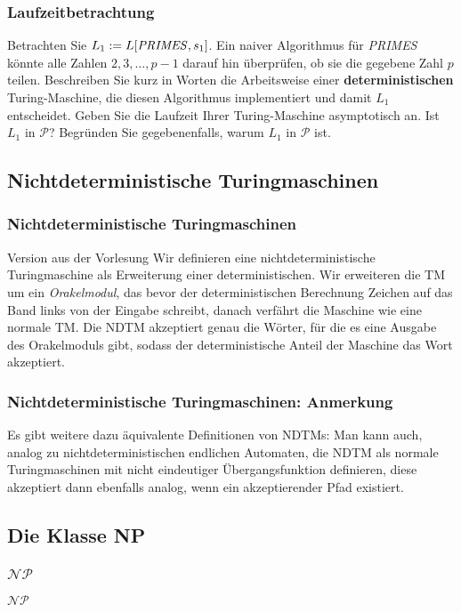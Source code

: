 \documentclass{beamer}
\begin{document}
{\begin{frame}
 \frametitle{Laufzeitbetrachtung}
 Betrachten Sie $L_1 := L[\text{\textit{PRIMES}},s_1]$. 
Ein naiver Algorithmus für \textit{PRIMES} könnte alle Zahlen $2,3,\ldots,p-1$ darauf hin überprüfen, ob sie die gegebene Zahl $p$ teilen. 
Beschreiben Sie kurz in Worten die Arbeitsweise einer \textbf{deterministischen} Turing-Maschine, die diesen Algorithmus implementiert und damit $L_1$ entscheidet. 
Geben Sie die Laufzeit Ihrer Turing-Maschine asymptotisch an. Ist $L_1$ in $\mathcal{P}$? Begründen Sie gegebenenfalls, warum $L_1$ in $\mathcal{P}$ ist.
\end{frame}

\subsection{Nichtdeterministische Turingmaschinen}
\begin{frame}
\frametitle{Nichtdeterministische Turingmaschinen}

\begin{block}{Version aus der Vorlesung}
Wir definieren eine nichtdeterministische Turingmaschine als Erweiterung einer deterministischen.
 Wir erweiteren die TM um ein \emph{Orakelmodul}, das bevor der deterministischen Berechnung Zeichen auf das Band links von der Eingabe schreibt,
 danach verfährt die Maschine wie eine normale TM.
 Die NDTM akzeptiert genau die Wörter, für die es eine Ausgabe des Orakelmoduls gibt,
 sodass der deterministische Anteil der Maschine das Wort akzeptiert.
\end{block}
\end{frame}
\begin{frame}
\frametitle{Nichtdeterministische Turingmaschinen: Anmerkung}
Es gibt weitere dazu äquivalente Definitionen von NDTMs:
 Man kann auch, analog zu nichtdeterministischen endlichen Automaten, die NDTM als normale Turingmaschinen mit nicht eindeutiger Übergangsfunktion definieren,
 diese akzeptiert dann ebenfalls analog, wenn ein akzeptierender Pfad existiert.\\
\end{frame}

\subsection{Die Klasse NP}
\begin{frame}
\frametitle{$\mathcal{NP}$}
\begin{block}{$\mathcal{NP}$}


\end{block}
\end{frame}}
\end{document}
